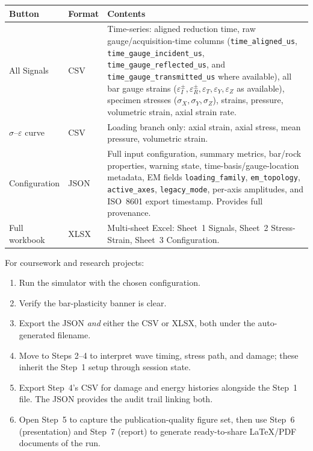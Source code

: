 \documentclass[11pt,a4paper,openany]{book}
\theoremstyle{handbook}
\newcommand{\sig}{\sigma}
\newcommand{\eps}{\varepsilon}
\begin{document}
\begin{center}
\renewcommand{\arraystretch}{1.4}
\small
\begin{tabular}{@{}p{3.4cm}p{2cm}p{8.5cm}@{}}
\toprule
\textbf{Button} & \textbf{Format} & \textbf{Contents} \\
\midrule
All Signals & CSV &
  Time-series: aligned reduction time, raw gauge/acquisition-time columns
  (\texttt{time\_aligned\_us}, \texttt{time\_gauge\_incident\_us},
  \texttt{time\_gauge\_reflected\_us}, and
  \texttt{time\_gauge\_transmitted\_us} where available), all bar gauge strains
  ($\eps_I^{\pm},\eps_R^{\pm},\eps_T,\eps_Y,\eps_Z$ as available),
  specimen stresses ($\sig_X,\sig_Y,\sig_Z$), strains, pressure,
  volumetric strain, axial strain rate. \\
$\sig$--$\eps$ curve & CSV &
  Loading branch only: axial strain, axial stress, mean pressure,
  volumetric strain. \\
Configuration & JSON &
  Full input configuration, summary metrics, bar/rock properties,
  warning state, time-basis/gauge-location metadata, EM fields
  \texttt{loading\_family}, \texttt{em\_topology}, \texttt{active\_axes},
  \texttt{legacy\_mode}, per-axis amplitudes, and ISO~8601 export
  timestamp. Provides full provenance. \\
Full workbook & XLSX &
  Multi-sheet Excel: Sheet~1 Signals, Sheet~2 Stress-Strain,
  Sheet~3 Configuration. \\
\bottomrule
\end{tabular}
\end{center}

\begin{conceptbox}
For coursework and research projects:
\begin{enumerate}[leftmargin=2em,itemsep=2pt]
  \item Run the simulator with the chosen configuration.
  \item Verify the bar-plasticity banner is clear.
  \item Export the JSON \emph{and} either the CSV or XLSX, both under the
        auto-generated filename.
  \item Move to Steps 2--4 to interpret wave timing, stress path, and
        damage; these inherit the Step~1 setup through session state.
  \item Export Step~4's CSV for damage and energy histories alongside the
        Step~1 file. The JSON provides the audit trail linking both.
  \item Open Step~5 to capture the publication-quality figure set, then use
        Step~6 (presentation) and Step~7 (report) to generate ready-to-share
        LaTeX/PDF documents of the run.
\end{enumerate}
\end{conceptbox}
\end{document}
